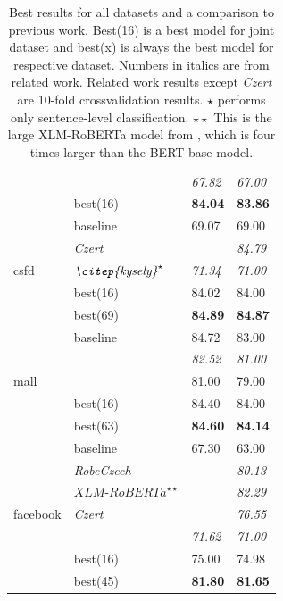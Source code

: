 \begin{table}[!h]
\begin{tabular}{|l|l||ll|}
                           & \textit{\citep{kysely}} & \textit{67.82} & \textit{67.00} \\ \cline{2-4}
                           & best(16)    & \textbf{84.04} & \textbf{83.86} \\ \hline \hline
\multirow{5}{*}{csfd}      & baseline    & 69.07 & 69.00 \\ \cline{2-4} 
& \textit{Czert}       &       & \textit{84.79} \\ \cline{2-4} 
& $\textit{\citep{kysely}}^\star$ & \textit{71.34} & \textit{71.00} \\ \cline{2-4}
                           & best(16)    & 84.02 & 84.00\\ \cline{2-4} 
                           & best(69)    & \textbf{84.89 }& \textbf{84.87} \\ \hline \hline
\multirow{5}{*}{mall}      & baseline    & 84.72 & 83.00 \\ \cline{2-4} 
& \textit{\citep{kysely}} & \textit{82.52} & \textit{81.00} \\ \cline{2-4}
& \textit{\citep{Klouda}} & 81.00 & 79.00 \\ \cline{2-4}
                           & best(16)    & 84.40 & 84.00 \\ \cline{2-4} 
                           & best(63)    & \textbf{84.60} & \textbf{84.14} \\ \hline \hline
\multirow{7}{*}{facebook}  & baseline    & 67.30 & 63.00 \\ \cline{2-4} 
& \textit{RobeCzech }  &       & \textit{80.13} \\ \cline{2-4} 
& $\textit{XLM-RoBERTa}^{\star\star}$ &       & \textit{82.29} \\ \cline{2-4} 
& \textit{Czert}       &       & \textit{76.55} \\ \cline{2-4} 
& \textit{\citep{kysely}} & \textit{71.62} & \textit{71.00} \\ \cline{2-4}
                           & best(16)    & 75.00 & 74.98 \\ \cline{2-4} 
                           & best(45)    & \textbf{81.80} & \textbf{81.65} \\ \hline
\end{tabular}
\caption{Best results for all datasets and a comparison to previous work. Best(16) is a best model for joint dataset and best(x) is always the best model for respective dataset. Numbers in italics are from related work. Related work results except \textit{Czert} are 10-fold crossvalidation results. $\star$ \citep{kysely} performs only sentence-level classification. $\star\star$ This is the large XLM-RoBERTa model from \citet{Straka2021}, which is four times larger than the BERT base model.  }
\label{tab:res_sent_best}
\end{table}

